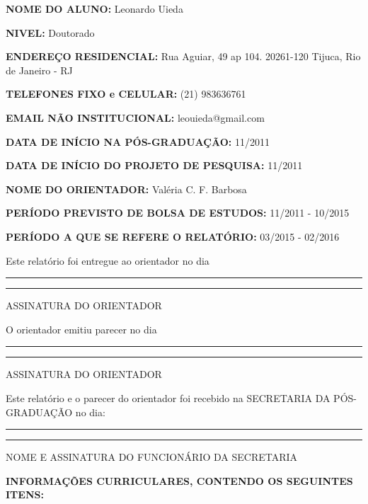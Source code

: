 \documentclass[12pt,a4paper]{article}
\begin{document}
\begin{flushleft}

{\bfseries
NOME DO ALUNO:
}
Leonardo Uieda

{\bfseries
NIVEL:
}
Doutorado

{\bfseries
ENDEREÇO RESIDENCIAL:
}
Rua Aguiar, 49 ap 104. 20261-120 Tijuca, Rio de Janeiro - RJ

{\bfseries
TELEFONES FIXO e CELULAR:
}
(21) 983636761

{\bfseries
EMAIL NÃO INSTITUCIONAL:
}
leouieda@gmail.com

{\bfseries
DATA DE INÍCIO NA PÓS-GRADUAÇÃO:
}
11/2011

{\bfseries
DATA DE INÍCIO DO PROJETO DE PESQUISA:
}
11/2011

{\bfseries
NOME DO ORIENTADOR:
}
Valéria C. F. Barbosa

{\bfseries
PERÍODO PREVISTO DE BOLSA DE ESTUDOS:
}
11/2011 - 10/2015

{\bfseries
PERÍODO A QUE SE REFERE O RELATÓRIO:
}
03/2015 - 02/2016

\vfill

{\small Este relatório foi entregue ao orientador no dia}
\rule{1.5cm}{0.4pt}
\hfill
\rule{4cm}{0.4pt}

\vspace{-0.2cm}

\hfill {\tiny ASSINATURA DO ORIENTADOR}

\vspace{0.5cm}

{\small O orientador emitiu parecer no dia}
\rule{1.5cm}{0.4pt}
\hfill
\rule{4cm}{0.4pt}

\vspace{-0.2cm}
\hfill {\tiny ASSINATURA DO ORIENTADOR}

\vspace{0.5cm}

{\small Este relatório e o parecer do orientador foi recebido na
SECRETARIA DA PÓS-GRADUAÇÃO no dia:}

\vspace{0.5cm}

\rule{3cm}{0.4pt}
\hfill
\rule{10cm}{0.4pt}

\vspace{-0.2cm}

\hfill {\tiny NOME E ASSINATURA DO FUNCIONÁRIO DA SECRETARIA}

\end{flushleft}

\newpage

\begin{center}
\textbf{\large INFORMAÇÕES CURRICULARES, CONTENDO OS SEGUINTES ITENS:}
\end{center}
\end{document}
